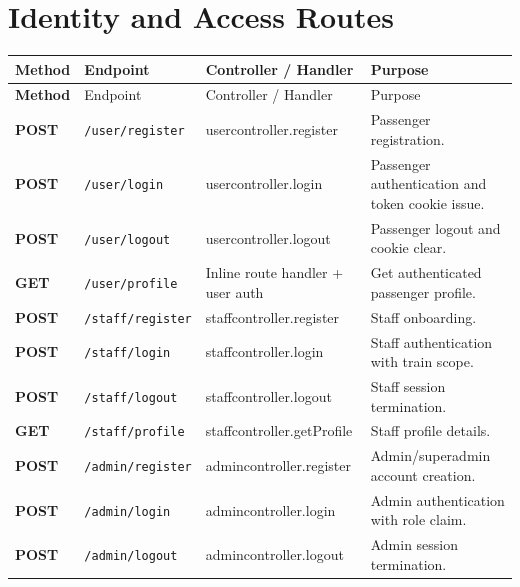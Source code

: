 \documentclass[12pt,a4paper]{report}
\begin{document}
\section{Identity and Access Routes}
\begin{longtable}{>{\bfseries}p{} p{} p{} p{}}
\toprule
\rowcolor{TableHeader}
\textcolor{TableHeaderText}{Method} & \textcolor{TableHeaderText}{Endpoint} & \textcolor{TableHeaderText}{Controller / Handler} & \textcolor{TableHeaderText}{Purpose} \\
\midrule
\endfirsthead
\toprule
\rowcolor{TableHeader}
\textcolor{TableHeaderText}{Method} & \textcolor{TableHeaderText}{Endpoint} & \textcolor{TableHeaderText}{Controller / Handler} & \textcolor{TableHeaderText}{Purpose} \\
\midrule
\endhead
POST & \texttt{/user/register} & usercontroller.register & Passenger registration. \\
POST & \texttt{/user/login} & usercontroller.login & Passenger authentication and token cookie issue. \\
POST & \texttt{/user/logout} & usercontroller.logout & Passenger logout and cookie clear. \\
GET & \texttt{/user/profile} & Inline route handler + user auth & Get authenticated passenger profile. \\
POST & \texttt{/staff/register} & staffcontroller.register & Staff onboarding. \\
POST & \texttt{/staff/login} & staffcontroller.login & Staff authentication with train scope. \\
POST & \texttt{/staff/logout} & staffcontroller.logout & Staff session termination. \\
GET & \texttt{/staff/profile} & staffcontroller.getProfile & Staff profile details. \\
POST & \texttt{/admin/register} & admincontroller.register & Admin/superadmin account creation. \\
POST & \texttt{/admin/login} & admincontroller.login & Admin authentication with role claim. \\
POST & \texttt{/admin/logout} & admincontroller.logout & Admin session termination. \\
\bottomrule
\end{longtable}
\end{document}
